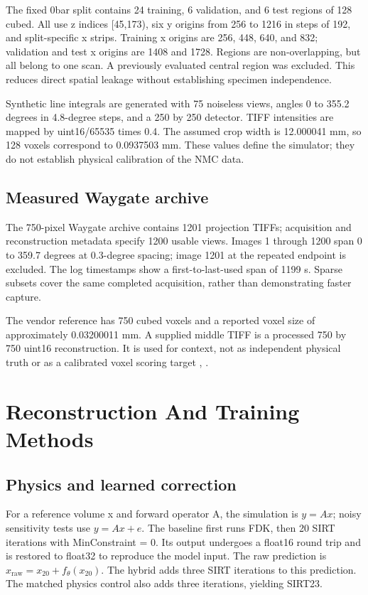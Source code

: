 \documentclass[conference,a4paper]{IEEEtran}
\begin{document}
The fixed 0bar split contains 24 training, 6 validation, and 6 test regions of 128 cubed. All use z indices [45,173), six y origins from 256 to 1216 in steps of 192, and split-specific x strips. Training x origins are 256, 448, 640, and 832; validation and test x origins are 1408 and 1728. Regions are non-overlapping, but all belong to one scan. A previously evaluated central region was excluded. This reduces direct spatial leakage without establishing specimen independence.

Synthetic line integrals are generated with 75 noiseless views, angles 0 to 355.2 degrees in 4.8-degree steps, and a 250 by 250 detector. TIFF intensities are mapped by uint16/65535 times 0.4. The assumed crop width is 12.000041 mm, so 128 voxels correspond to 0.0937503 mm. These values define the simulator; they do not establish physical calibration of the NMC data.

\subsection{Measured Waygate archive}

The 750-pixel Waygate archive contains 1201 projection TIFFs; acquisition and reconstruction metadata specify 1200 usable views. Images 1 through 1200 span 0 to 359.7 degrees at 0.3-degree spacing; image 1201 at the repeated endpoint is excluded. The log timestamps show a first-to-last-used span of 1199 s. Sparse subsets cover the same completed acquisition, rather than demonstrating faster capture.

The vendor reference has 750 cubed voxels and a reported voxel size of approximately 0.03200011 mm. A supplied middle TIFF is a processed 750 by 750 uint16 reconstruction. It is used for context, not as independent physical truth or as a calibrated voxel scoring target \cite{ref9}, \cite{ref10}.

\section{Reconstruction And Training Methods}

\subsection{Physics and learned correction}

For a reference volume x and forward operator A, the simulation is $y = Ax$; noisy sensitivity tests use $y = Ax + e$. The baseline first runs FDK, then 20 SIRT iterations with MinConstraint = 0. Its output undergoes a float16 round trip and is restored to float32 to reproduce the model input. The raw prediction is $x_{\mathrm{raw}}=x_{20}+f_{\theta}(x_{20})$. The hybrid adds three SIRT iterations to this prediction. The matched physics control also adds three iterations, yielding SIRT23.
\end{document}
